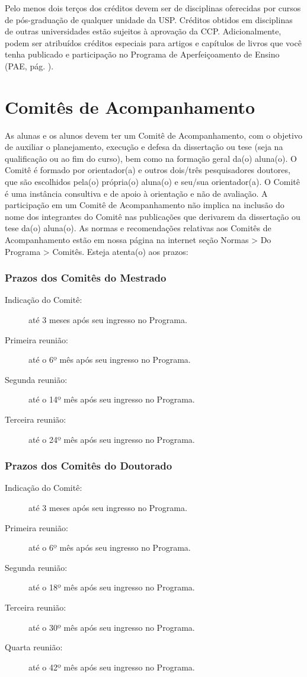 \documentclass[twoside a4paper 12pt]{report}
\begin{document}
Pelo menos dois terços dos créditos devem ser de disciplinas oferecidas por cursos de pós-graduação de qualquer unidade da USP. Créditos obtidos em disciplinas de outras universidades estão sujeitos à aprovação da CCP. Adicionalmente, podem ser atribuídos créditos especiais para artigos e capítulos de livros que você tenha publicado e participação no Programa de Aperfeiçoamento de Ensino (PAE, pág. \pageref{subsec:pae}).


\section{Comitês de Acompanhamento}
\label{sec:comites}

As alunas e os alunos devem ter um Comitê de Acompanhamento, com o objetivo de auxiliar o planejamento, execução e defesa da dissertação ou tese (seja na qualificação ou ao fim do curso), bem como na formação geral da(o) aluna(o). O Comitê é formado por orientador(a) e outros dois/três pesquisadores doutores, que são escolhidos pela(o) própria(o) aluna(o) e seu/sua orientador(a). O Comitê é uma instância consultiva e de apoio à orientação e não de avaliação. A participação em um Comitê de Acompanhamento não implica na inclusão do nome dos integrantes do Comitê nas publicações que derivarem da dissertação ou tese da(o) aluna(o). As normas e recomendações relativas aos Comitês de Acompanhamento estão em nossa página na internet seção Normas \textgreater{} Do Programa \textgreater{} Comitês. Esteja atenta(o) aos prazos:

\subsubsection{Prazos dos Comitês do Mestrado}
\begin{description}
\item[Indicação do Comitê:] até 3 meses após seu ingresso no Programa.
\item[Primeira reunião:] até o 6º mês após seu ingresso no Programa.
\item[Segunda reunião:] até  o 14º mês após seu ingresso no Programa.
\item[Terceira reunião:] até  o 24º mês após seu ingresso no Programa.
\end{description}

\subsubsection{Prazos dos Comitês do Doutorado}
\begin{description}
\item[Indicação do Comitê:] até 3 meses após seu ingresso no Programa.
\item[Primeira reunião:] até o 6º mês após seu ingresso no Programa.
\item[Segunda reunião:] até  o 18º mês após seu ingresso no Programa.
\item[Terceira reunião:] até  o 30º mês após seu ingresso no Programa.
\item[Quarta reunião:] até  o 42º mês após seu ingresso no Programa.
\end{description}
\end{document}
